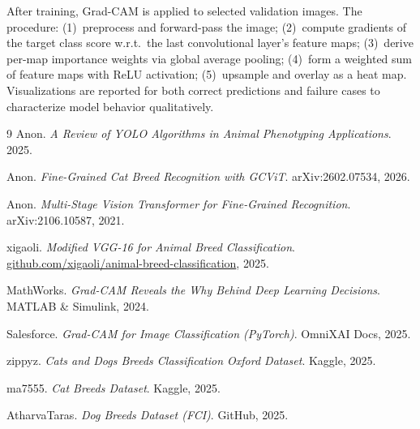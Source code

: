 \documentclass[10pt,twocolumn,letterpaper]{article}
\begin{document}
After training, Grad-CAM is applied to selected validation images. The procedure: (1)~preprocess and forward-pass the image; (2)~compute gradients of the target class score w.r.t.\ the last convolutional layer's feature maps; (3)~derive per-map importance weights via global average pooling; (4)~form a weighted sum of feature maps with ReLU activation; (5)~upsample and overlay as a heat map. Visualizations are reported for both correct predictions and failure cases to characterize model behavior qualitatively.

\begin{thebibliography}{9}
\small
{}
Anon. \textit{A Review of YOLO Algorithms in Animal Phenotyping Applications}. 2025.

Anon. \textit{Fine-Grained Cat Breed Recognition with GCViT}. arXiv:2602.07534, 2026.

Anon. \textit{Multi-Stage Vision Transformer for Fine-Grained Recognition}. arXiv:2106.10587, 2021.

xigaoli. \textit{Modified VGG-16 for Animal Breed Classification}. \url{github.com/xigaoli/animal-breed-classification}, 2025.

MathWorks. \textit{Grad-CAM Reveals the Why Behind Deep Learning Decisions}. MATLAB \& Simulink, 2024.

Salesforce. \textit{Grad-CAM for Image Classification (PyTorch)}. OmniXAI Docs, 2025.

zippyz. \textit{Cats and Dogs Breeds Classification Oxford Dataset}. Kaggle, 2025.

ma7555. \textit{Cat Breeds Dataset}. Kaggle, 2025.

AtharvaTaras. \textit{Dog Breeds Dataset (FCI)}. GitHub, 2025.
\end{thebibliography}
\end{document}
